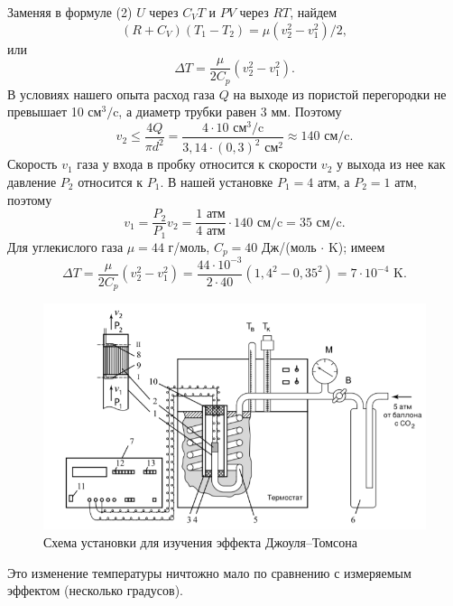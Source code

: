 \documentclass[a4paper, 12pt]{article}
\begin{document}
\indent Заменяя в формуле (2) $U$ через $C_{V}T$ и $PV$ через $RT$, найдем
\begin{equation*}
	(R + C_{V})(T_{1} - T_{2}) = \mu (v_{2}^2 - v_{1}^2)/2,
\end{equation*}
\noindent или
\begin{equation*}
	\Delta T = \frac{\mu}{2C_{p}}(v_{2}^2 - v_{1}^2).
\end{equation*}
\noindent В условиях нашего опыта расход газа $Q$ на выходе из пористой перегородки не превышает 10 см$^3/$c, а диаметр трубки равен 3 мм. Поэтому
\begin{equation*}
	v_{2} \leqslant \frac{4Q}{\pi d^2} = \frac{4 \cdot 10  \text{ см}^3/\text{c}}{3,14 \cdot (0,3)^2 \text{ см}^2} \approx 140 \text{ см/c}.
\end{equation*}
\noindent Скорость $v_{1}$ газа у входа в пробку относится к скорости $v_{2}$ у выхода из нее как давление $P_{2}$ относится к $P_{1}$. В нашей установке $P_{1} = 4 $ атм, а $P_{2} = 1 $ атм, поэтому
\begin{equation*}
	v_{1} = \frac{P_{2}}{P_{1}}v_{2} = \frac{1 \text{ атм}}{4 \text{ атм}}\cdot 140 \text{ см/c} = 35 \text{ см/c}.
\end{equation*}
\noindent Для углекислого газа $\mu = 44$ г/моль, $C_{p} = 40$ Дж/(моль $\cdot$ K); имеем
\begin{equation*}
	\Delta T = \frac{\mu}{2C_{p}}(v_{2}^2 - v_{1}^2) = \frac{44 \cdot 10^{-3}}{2 \cdot 40}(1,4^2 - 0,35^2) = 7 \cdot 10^{-4} \text{ K}.
\end{equation*}
\newpage
\begin{figure}[H]
	\centering
	\includegraphics{Рис 1.png}
	\caption{Схема установки для изучения эффекта Джоуля–Томсона}
\end{figure}
\noindent Это изменение температуры ничтожно мало по сравнению с измеряемым эффектом (несколько градусов).
\end{document}
